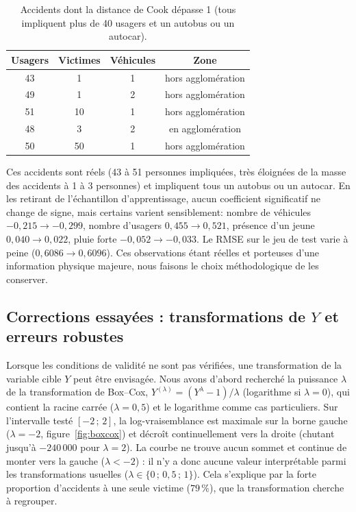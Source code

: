 \documentclass[11pt,a4paper]{article}
\begin{document}
\begin{table}[H]
\centering
\small
\begin{tabular}{cccc}
\toprule
\textbf{Usagers} & \textbf{Victimes} & \textbf{Véhicules} & \textbf{Zone} \\
\midrule
43 & 1  & 1 & hors agglomération \\
49 & 1  & 2 & hors agglomération \\
51 & 10 & 1 & hors agglomération \\
48 & 3  & 2 & en agglomération \\
50 & 50 & 1 & hors agglomération \\
\bottomrule
\end{tabular}
\caption{Accidents dont la distance de Cook dépasse 1 (tous impliquent plus de 40 usagers et un autobus ou un autocar).}
\label{tab:influents}
\end{table}

Ces accidents sont réels (43 à 51 personnes impliquées, très éloignées de la masse des accidents à 1 à 3 personnes) et impliquent tous un autobus ou un autocar. En les retirant de l'échantillon d'apprentissage, aucun coefficient significatif ne change de signe, mais certains varient sensiblement: nombre de véhicules $-0{,}215 \to -0{,}299$, nombre d'usagers $0{,}455 \to 0{,}521$, présence d'un jeune $0{,}040 \to 0{,}022$, pluie forte $-0{,}052 \to -0{,}033$. Le RMSE sur le jeu de test varie à peine ($0{,}6086 \to 0{,}6096$). Ces observations étant réelles et porteuses d'une information physique majeure, nous faisons le choix méthodologique de les conserver.

\subsection{Corrections essayées : transformations de $Y$ et erreurs robustes}
Lorsque les conditions de validité ne sont pas vérifiées, une transformation de la variable cible $Y$ peut être envisagée. Nous avons d'abord recherché la puissance $\lambda$ de la transformation de Box--Cox, $Y^{(\lambda)} = (Y^{\lambda} - 1)/\lambda$ (logarithme si $\lambda = 0$), qui contient la racine carrée ($\lambda = 0{,}5$) et le logarithme comme cas particuliers. Sur l'intervalle testé $[-2\,;\,2]$, la log-vraisemblance est maximale sur la borne gauche ($\lambda = -2$, figure~\ref{fig:boxcox}) et décroît continuellement vers la droite (chutant jusqu'à $-240\,000$ pour $\lambda = 2$). La courbe ne trouve aucun sommet et continue de monter vers la gauche ($\lambda < -2$) : il n'y a donc aucune valeur interprétable parmi les transformations usuelles ($\lambda \in \{0\,;\,0{,}5\,;\,1\}$). Cela s'explique par la forte proportion d'accidents à une seule victime ($79\,\%$), que la transformation cherche à regrouper.
\end{document}
